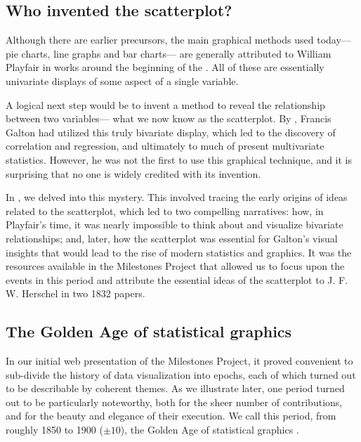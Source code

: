 \subsection{Who invented the scatterplot?}
Although there are earlier precursors, the main graphical methods used today---
pie charts, line graphs and bar charts--- are generally attributed to
William Playfair in works around the beginning of the 
\citep{Playfair:1786,Playfair:1801}.
All of these are essentially univariate
displays of some aspect of a single variable. 

A logical next step would be to invent a method to reveal the relationship 
between two variables--- what we now know as the scatterplot.
By \citeyear{Galton:1886}, Francis Galton had utilized this truly bivariate 
display, which led to the
discovery of correlation and regression, and ultimately to much of present 
multivariate
statistics. 
However, he was not the first to use this graphical technique, and it is 
surprising that no one is widely credited with its invention.

In \citet{FriendlyDenis:05:scat}, we delved into this mystery.
This involved tracing the early origins of ideas related to the scatterplot, 
which led to two compelling narratives: how, in Playfair's time, it was nearly 
impossible to think about and visualize bivariate relationships; and, later, 
how the scatterplot was essential for Galton's visual insights that would lead 
to the rise of modern statistics and graphics.
It was the resources available in the Milestones Project that allowed us to 
focus upon the events in this period and attribute the essential ideas of the 
scatterplot to J. F. W. Herschel in two 1832 papers.

\subsection{The Golden Age of statistical graphics}

In our initial web presentation of the Milestones Project, it proved convenient
to sub-divide the history of data visualization into epochs, each of which 
turned
out to be describable by coherent themes.
As we illustrate later, one
period turned out to be particularly noteworthy, both for the sheer number of
contributions, and for the beauty and elegance of their execution.
We call this period, from roughly 1850 to 1900 ($\pm 10$), the Golden Age of 
statistical graphics \citep{Friendly:2008:golden}.

